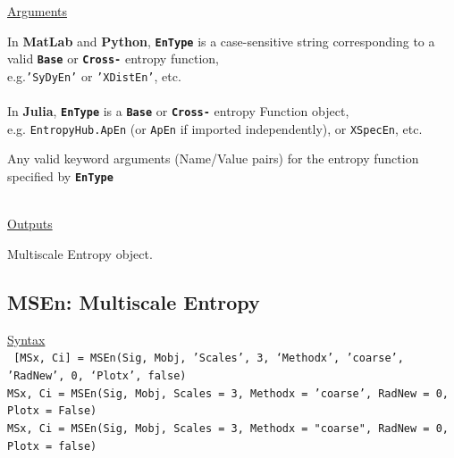 \documentclass[12pt, a4paper, titlepage, openany]{book}
\begin{document}
\noindent \ul{Arguments}
\begin{description}[labelsep=2cm, labelwidth=5cm, nosep, style=multiline,leftmargin=4cm]\footnotesize
\item[\texttt{EnType}]		In \textbf{MatLab} and \textbf{Python}, \texttt{\textbf{EnType}} is a case-sensitive 							string corresponding to a valid \texttt{\textbf{Base}} or  \texttt{\textbf{Cross-}} entropy 							function, \\	e.g.\texttt{'SyDyEn'} or \texttt{'XDistEn'}, etc.\\ \ \\
							In \textbf{Julia}, \texttt{\textbf{EnType}} is a \texttt{\textbf{Base}} or  									\texttt{\textbf{Cross-}} entropy Function object,\\ e.g. \texttt{EntropyHub.ApEn} (or 									\texttt{ApEn} if imported independently), or \texttt{XSpecEn}, etc.\\
\item[\texttt{varargin\\ **kwargs\\kwargs...}] 		Any valid keyword arguments (Name/Value pairs) for the entropy function specified by \texttt{\textbf{EnType}}\\
\end{description}

\ \\ \noindent \ul{Outputs}
\begin{description}[labelsep=1cm, labelwidth=2cm, nosep, style=multiline,leftmargin=4cm]\footnotesize
\item[\texttt{Mobj}]		Multiscale Entropy object.
\end{description}



\newpage
\subsection{\normalsize MSEn: \hspace{15mm} Multiscale Entropy} \label{MSEn}
\noindent\ul{Syntax} \vspace{6mm} \\ \noindent \texttt{\footnotesize
[MSx, Ci] = MSEn(Sig, Mobj, 'Scales', 3, ‘Methodx’, 'coarse', 'RadNew', 0, ‘Plotx’, false)\\
MSx, Ci = MSEn(Sig, Mobj, Scales = 3, Methodx = 'coarse', RadNew = 0, Plotx = False)\\ 
MSx, Ci = MSEn(Sig, Mobj, Scales = 3, Methodx = "coarse", RadNew = 0, Plotx = false)}
\end{document}
